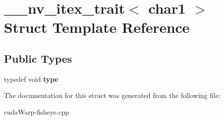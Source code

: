 \hypertarget{struct____nv__itex__trait_3_01char1_01_4}{}\section{\+\_\+\+\_\+nv\+\_\+itex\+\_\+trait$<$ char1 $>$ Struct Template Reference}
\label{struct____nv__itex__trait_3_01char1_01_4}
\subsection*{Public Types}
\begin{DoxyCompactItemize}
\item 
typedef void {\bfseries type}\hypertarget{struct____nv__itex__trait_3_01char1_01_4_a33f7e95514cc749ea067b6a1993cbfa8}{}\label{struct____nv__itex__trait_3_01char1_01_4_a33f7e95514cc749ea067b6a1993cbfa8}

\end{DoxyCompactItemize}


The documentation for this struct was generated from the following file\+:\begin{DoxyCompactItemize}
\item 
cuda\+Warp-\/fisheye.\+cpp\end{DoxyCompactItemize}
